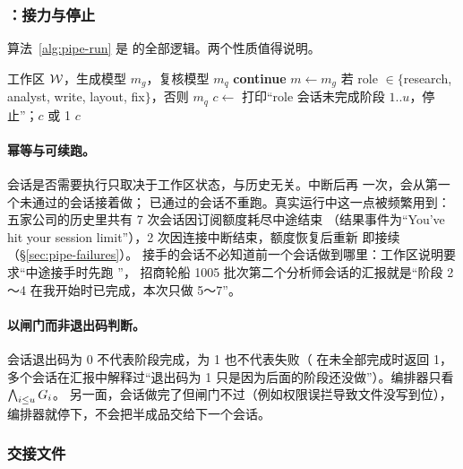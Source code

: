 \subsubsection{：接力与停止}

算法~\ref{alg:pipe-run} 是  的全部逻辑。两个性质值得说明。

\begin{algorithm}[t]
\caption{：五个会话的接力}
\label{alg:pipe-run}
\begin{algorithmic}[1]
\Require 工作区 $\mathcal{W}$，生成模型 $m_g$，复核模型 $m_q$
 
   \textbf{continue} 
  \EndIf
  \State $m \gets m_g$ 若 role $\in\{$research, analyst, write, layout, fix$\}$，否则 $m_q$
  \State $c \gets$  
    \State 打印“role 会话未完成阶段 $1..u$，停止”；\Return $c$ 或 1
  \EndIf
\EndFor
\State \Return $c$
\end{algorithmic}
\end{algorithm}

\paragraph{幂等与可续跑。}会话是否需要执行只取决于工作区状态，与历史无关。中断后再  一次，会从第一个未通过的会话接着做；
已通过的会话不重跑。真实运行中这一点被频繁用到：五家公司的历史里共有 7 次会话因订阅额度耗尽中途结束
（结果事件为“You've hit your session limit”），2 次因连接中断结束，额度恢复后重新  即接续（\S\ref{sec:pipe-failures}）。
接手的会话不必知道前一个会话做到哪里：工作区说明要求“中途接手时先跑 ”，
招商轮船 1005 批次第二个分析师会话的汇报就是“阶段 2～4 在我开始时已完成，本次只做 5～7”。

\paragraph{以闸门而非退出码判断。}会话退出码为 0 不代表阶段完成，为 1 也不代表失败（ 在未全部完成时返回 1，
多个会话在汇报中解释过“退出码为 1 只是因为后面的阶段还没做”）。编排器只看 $\bigwedge_{i\le u}G_{i}$。
另一面，会话做完了但闸门不过（例如权限误拦导致文件没写到位），编排器就停下，不会把半成品交给下一个会话。

\subsubsection{交接文件}

